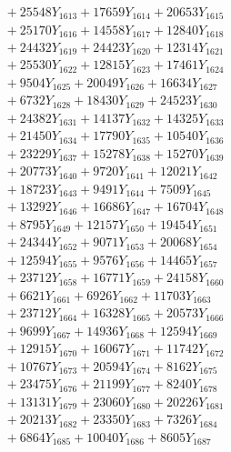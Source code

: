 \documentclass[a4paper,10pt]{article}
\begin{document}
{\begin{align}
&\;  + 25548 Y_{1613} + 17659 Y_{1614} + 20653 Y_{1615} \\[0.3ex]
&\;  + 25170 Y_{1616} + 14558 Y_{1617} + 12840 Y_{1618} \\[0.5ex]\allowbreak
&\;  + 24432 Y_{1619} + 24423 Y_{1620} + 12314 Y_{1621} \\[0.3ex]
&\;  + 25530 Y_{1622} + 12815 Y_{1623} + 17461 Y_{1624} \\[0.3ex]
&\;  + 9504 Y_{1625} + 20049 Y_{1626} + 16634 Y_{1627} \\[0.3ex]
&\;  + 6732 Y_{1628} + 18430 Y_{1629} + 24523 Y_{1630} \\[0.3ex]
&\;  + 24382 Y_{1631} + 14137 Y_{1632} + 14325 Y_{1633} \\[0.3ex]
&\;  + 21450 Y_{1634} + 17790 Y_{1635} + 10540 Y_{1636} \\[0.3ex]
&\;  + 23229 Y_{1637} + 15278 Y_{1638} + 15270 Y_{1639} \\[0.3ex]
&\;  + 20773 Y_{1640} + 9720 Y_{1641} + 12021 Y_{1642} \\[0.3ex]
&\;  + 18723 Y_{1643} + 9491 Y_{1644} + 7509 Y_{1645} \\[0.3ex]
&\;  + 13292 Y_{1646} + 16686 Y_{1647} + 16704 Y_{1648} \\[0.5ex]\allowbreak
&\;  + 8795 Y_{1649} + 12157 Y_{1650} + 19454 Y_{1651} \\[0.3ex]
&\;  + 24344 Y_{1652} + 9071 Y_{1653} + 20068 Y_{1654} \\[0.3ex]
&\;  + 12594 Y_{1655} + 9576 Y_{1656} + 14465 Y_{1657} \\[0.3ex]
&\;  + 23712 Y_{1658} + 16771 Y_{1659} + 24158 Y_{1660} \\[0.3ex]
&\;  + 6621 Y_{1661} + 6926 Y_{1662} + 11703 Y_{1663} \\[0.3ex]
&\;  + 23712 Y_{1664} + 16328 Y_{1665} + 20573 Y_{1666} \\[0.3ex]
&\;  + 9699 Y_{1667} + 14936 Y_{1668} + 12594 Y_{1669} \\[0.3ex]
&\;  + 12915 Y_{1670} + 16067 Y_{1671} + 11742 Y_{1672} \\[0.3ex]
&\;  + 10767 Y_{1673} + 20594 Y_{1674} + 8162 Y_{1675} \\[0.3ex]
&\;  + 23475 Y_{1676} + 21199 Y_{1677} + 8240 Y_{1678} \\[0.5ex]\allowbreak
&\;  + 13131 Y_{1679} + 23060 Y_{1680} + 20226 Y_{1681} \\[0.3ex]
&\;  + 20213 Y_{1682} + 23350 Y_{1683} + 7326 Y_{1684} \\[0.3ex]
&\;  + 6864 Y_{1685} + 10040 Y_{1686} + 8605 Y_{1687} \\[0.3ex]

\end{align}}
\end{document}
